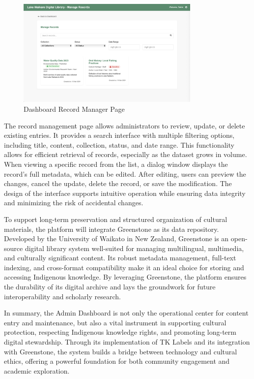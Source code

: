 \begin{figure}[H]
    \centering
    \includegraphics[width=0.8\textwidth]{screenshot/prototype_dashboard_managerecord.png}
    \caption{Dashboard Record Manager Page}
    \label{fig:architecture}
\end{figure}
The record management page allows administrators to review, update, or delete existing entries. It provides a search interface with multiple filtering options, including title, content, collection, status, and date range. This functionality allows for efficient retrieval of records, especially as the dataset grows in volume. When viewing a specific record from the list, a dialog window displays the record's full metadata, which can be edited. After editing, users can preview the changes, cancel the update, delete the record, or save the modification. The design of the interface supports intuitive operation while ensuring data integrity and minimizing the risk of accidental changes.

To support long-term preservation and structured organization of cultural materials, the platform will integrate Greenstone as its data repository. Developed by the University of Waikato in New Zealand, Greenstone is an open-source digital library system well-suited for managing multilingual, multimedia, and culturally significant content. Its robust metadata management, full-text indexing, and cross-format compatibility make it an ideal choice for storing and accessing Indigenous knowledge. By leveraging Greenstone, the platform ensures the durability of its digital archive and lays the groundwork for future interoperability and scholarly research.

In summary, the Admin Dashboard is not only the operational center for content entry and maintenance, but also a vital instrument in supporting cultural protection, respecting Indigenous knowledge rights, and promoting long-term digital stewardship. Through its implementation of TK Labels and its integration with Greenstone, the system builds a bridge between technology and cultural ethics, offering a powerful foundation for both community engagement and academic exploration.
